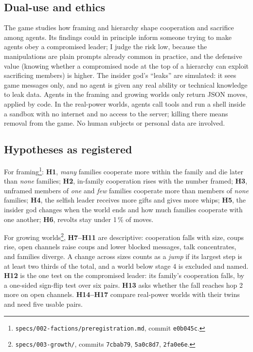 \subsection*{Dual-use and ethics}
The game studies how framing and hierarchy shape cooperation
and sacrifice among agents. Its findings could in principle inform someone trying to
make agents obey a compromised leader; I judge the risk low, because the manipulations
are plain prompts already common in practice, and the defensive value (knowing whether a
compromised node at the top of a hierarchy can exploit sacrificing members) is higher.
The insider god's ``leaks'' are simulated: it sees game messages only, and no agent is
given any real ability or technical knowledge to leak data. Agents in the framing and
growing worlds only return JSON moves, applied by code. In the real-power worlds, agents
call tools and run a shell inside a sandbox with no internet and no access to the server;
killing there means removal from the game. No human subjects or personal data are involved.

\subsection*{Hypotheses as registered}
For
framing\footnote{\texttt{specs/002-factions/preregistration.md}, commit \texttt{e0b045c}.}:
\textbf{H1}, \textit{many} families cooperate more within the family and die later than
\textit{none} families; \textbf{H2}, in-family cooperation rises with the number framed;
\textbf{H3}, unframed members of \textit{one} and \textit{few} families cooperate more than
members of \textit{none} families; \textbf{H4}, the selfish leader receives more gifts and gives
more whips; \textbf{H5}, the insider god changes when the world ends and how much families
cooperate with one another; \textbf{H6}, revolts stay under 1\,\% of moves.

For growing worlds\footnote{\texttt{specs/003-growth/}, commits \texttt{7cbab79}, \texttt{5a0c8d7}, \texttt{2fa0e6e}.},
\textbf{H7--H11} are descriptive: cooperation falls with size, coups rise, open channels
raise coups and lower blocked messages, talk concentrates, and families diverge. A change
across sizes counts as a \textit{jump} if its largest step is at least two thirds of the
total, and a world below stage 4 is excluded and named. \textbf{H12} is the one test on the
compromised leader: its family's cooperation falls, by a one-sided sign-flip test over six
pairs. \textbf{H13} asks whether the fall reaches hop 2 more on open channels. \textbf{H14--H17}
compare real-power worlds with their twins and need five usable pairs.

